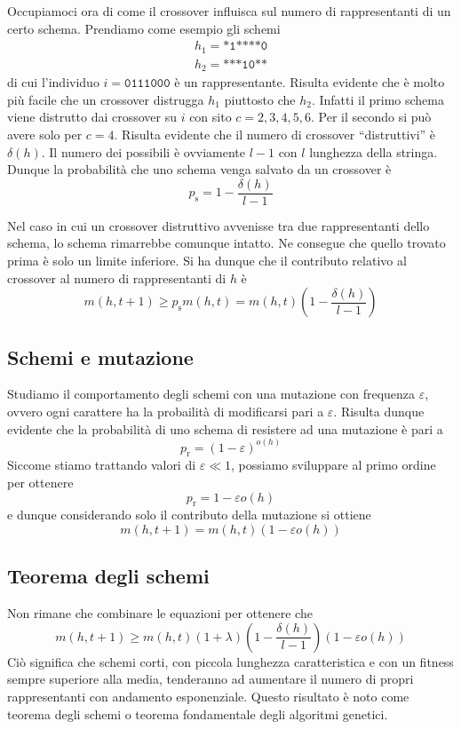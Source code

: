 \documentclass[a4paper, 11pt]{article}
\newcommand{\code}{\texttt}
\begin{document}
Occupiamoci ora di come il crossover influisca sul numero di rappresentanti di
un certo schema. Prendiamo come esempio gli schemi
\begin{align*}
h_1=\code{*1****0}\\
h_2=\code{***10**}
\end{align*}
di cui l'individuo $i=\code{0111000}$ \`e un rappresentante. Risulta evidente
che \`e molto pi\`u facile che un crossover distrugga $h_1$ piuttosto che
$h_2$. Infatti il primo schema viene distrutto dai crossover su $i$ con sito
$c=2,3,4,5,6$. Per il secondo si pu\`o avere solo per $c=4$. Risulta evidente
che il numero di crossover ``distruttivi'' \`e $\delta (h)$. Il numero dei
possibili \`e ovviamente $l-1$ con $l$ lunghezza della stringa. Dunque la
probabilit\`a che uno schema venga salvato da un crossover \`e
$$p_\text{s}=1-\frac{\delta (h)}{l-1}$$

Nel caso in cui un crossover distruttivo avvenisse tra due rappresentanti dello
schema, lo schema rimarrebbe comunque intatto. Ne consegue che quello trovato
prima \`e solo un limite inferiore. Si ha dunque che il contributo relativo al
crossover al numero di rappresentanti di $h$ \`e
$$m(h, t+1)\geq p_\text{s}m(h,t)=m(h,t)\left(1- \frac{\delta (h)}{l-1} \right)$$


\subsection{Schemi e mutazione}

Studiamo il comportamento degli schemi con una mutazione con frequenza
$\varepsilon$, ovvero ogni carattere ha la probailit\`a di modificarsi pari a
$\varepsilon$. Risulta dunque evidente che la probabilit\`a di uno schema di
resistere ad una mutazione \`e pari a 
$$p_\text{r}=\left(1-\varepsilon\right)^{o(h)}$$
Siccome stiamo trattando valori di $\varepsilon \ll 1$, possiamo sviluppare al
primo ordine per ottenere
$$p_\text{r}=1-\varepsilon o(h)$$
e dunque considerando solo il contributo della mutazione si ottiene
$$m(h,t+1)=m(h,t)\left(1-\varepsilon o(h)\right)$$


\subsection{Teorema degli schemi}

Non rimane che combinare le equazioni per ottenere che
$$m(h, t+1) \geq m(h,t) \left(1+\lambda \right) \left(1-\frac{\delta
(h)}{l-1}\right) \left(1- \varepsilon o(h) \right)$$
Ci\`o significa che schemi corti, con piccola lunghezza caratteristica e con un
fitness sempre superiore alla media, tenderanno ad aumentare il numero di propri
rappresentanti con andamento esponenziale. Questo risultato \`e noto come
teorema degli schemi o teorema fondamentale degli algoritmi genetici.
\end{document}
